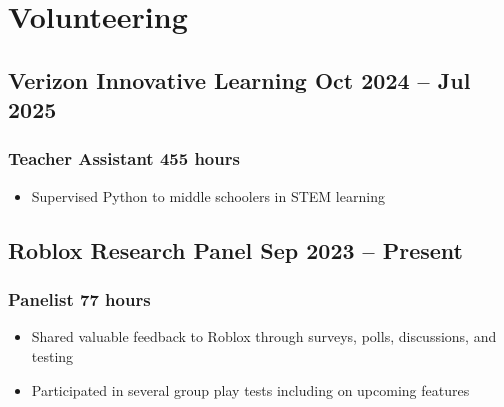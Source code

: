 \documentclass{my_cv}
\begin{document}
\section{Volunteering}

\subsection{Verizon Innovative Learning \hfill Oct 2024 -- Jul 2025}
\subsubsection{Teacher Assistant \hfill 455 hours}
\begin{itemize}
    \item Supervised Python to middle schoolers in STEM learning
\end{itemize}

\subsection{Roblox Research Panel \hfill Sep 2023 -- Present}
\subsubsection{Panelist \hfill 77 hours}
\begin{itemize}
    \item Shared valuable feedback to Roblox through surveys, polls, discussions, and testing
    \item Participated in several group play tests including on upcoming features
\end{itemize}
\end{document}
